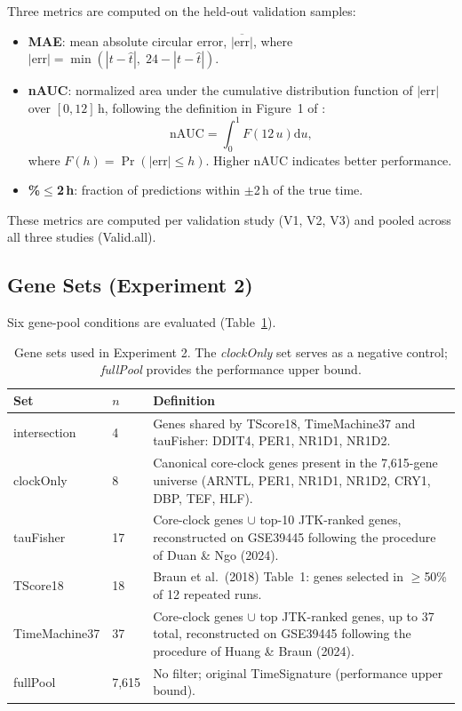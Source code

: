 \documentclass[10pt,a4paper]{article}
\begin{document}
Three metrics are computed on the held-out validation samples:
\begin{itemize}
  \item \textbf{MAE}: mean absolute circular error,
    $\overline{|\mathrm{err}|}$, where
    $|\mathrm{err}| = \min(|t - \hat t|,\; 24 - |t - \hat t|)$.
  \item \textbf{nAUC}: normalized area under the cumulative
    distribution function of $|\mathrm{err}|$ over $[0,12]$\,h,
    following the definition in Figure~1 of \citet{Braun2018}:
    \begin{equation}
      \mathrm{nAUC} = \int_0^1 F\!\left(12\,u\right) \mathrm{d}u,
      \label{eq:nauc}
    \end{equation}
    where $F(h) = \Pr(|\mathrm{err}| \leq h)$.
    Higher nAUC indicates better performance.
  \item \textbf{\%$\leq$2\,h}: fraction of predictions within
    $\pm$2\,h of the true time.
\end{itemize}
These metrics are computed per validation study (V1, V2, V3) and
pooled across all three studies (Valid.all).
 
\subsection{Gene Sets (Experiment 2)}
 
Six gene-pool conditions are evaluated (Table~\ref{tab:genesets}).
 
\begin{table}[h]
\centering
\begin{tabular}{llp{7.5cm}}
\toprule
Set & $n$ & Definition \\
\midrule
intersection  &  4 & Genes shared by TScore18, TimeMachine37 and
                     tauFisher: DDIT4, PER1, NR1D1, NR1D2. \\
clockOnly     &  8 & Canonical core-clock genes present in the
                     7,615-gene universe (ARNTL, PER1, NR1D1,
                     NR1D2, CRY1, DBP, TEF, HLF). \\
tauFisher     & 17 & Core-clock genes $\cup$ top-10 JTK-ranked
                     genes, reconstructed on GSE39445 following the
                     procedure of Duan \& Ngo (2024). \\
TScore18      & 18 & Braun et al.\ (2018) Table~1: genes selected
                     in $\geq$50\% of 12 repeated runs. \\
TimeMachine37 & 37 & Core-clock genes $\cup$ top JTK-ranked genes,
                     up to 37 total, reconstructed on GSE39445
                     following the procedure of Huang \& Braun
                     (2024). \\
fullPool      & 7,615 & No filter; original TimeSignature
                        (performance upper bound). \\
\bottomrule
\end{tabular}
\caption{Gene sets used in Experiment 2.  The
\emph{clockOnly} set serves as a negative control; \emph{fullPool}
provides the performance upper bound.}
\label{tab:genesets}
\end{table}
 
\end{document}
